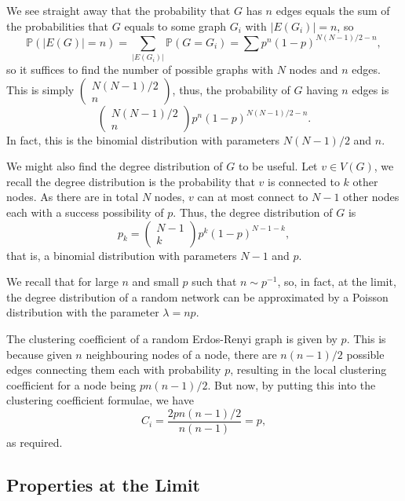 \documentclass[
]{article}
\theoremstyle{definition}
\theoremstyle{definition}
\begin{document}
We see straight away that the probability that \(G\) has \(n\) edges
equals the sum of the probabilities that \(G\) equals to some graph
\(G_i\) with \(\left| E(G_i) \right| = n\), so
\[\mathbb{P}(\left| E(G) \right| = n) = \sum_{\left| E(G_i) \right|}\mathbb{P}(G = G_i)
  = \sum p^n (1 - p)^{N (N - 1) / 2 - n},\] so it suffices to find the
number of possible graphs with \(N\) nodes and \(n\) edges. This is
simply \(\begin{pmatrix} N (N - 1) / 2 \\ n \end{pmatrix}\), thus, the
probability of \(G\) having \(n\) edges is
\[\begin{pmatrix} N (N - 1) / 2 \\ n \end{pmatrix}p^n (1 - p)^{N (N - 1) / 2 - n}.\]
In fact, this is the binomial distribution with parameters
\(N (N - 1) / 2\) and \(n\).

We might also find the degree distribution of \(G\) to be useful. Let
\(v \in V(G)\), we recall the degree distribution is the probability
that \(v\) is connected to \(k\) other nodes. As there are in total
\(N\) nodes, \(v\) can at most connect to \(N - 1\) other nodes each
with a success possibility of \(p\). Thus, the degree distribution of
\(G\) is
\[p_k = \begin{pmatrix} N - 1 \\ k \end{pmatrix} p^k (1 - p)^{N - 1 - k}, \]
that is, a binomial distribution with parameters \(N - 1\) and \(p\).

We recall that for large \(n\) and small \(p\) such that
\(n \sim p^{-1}\), so, in fact, at the limit, the degree distribution of
a random network can be approximated by a Poisson distribution with the
parameter \(\lambda = np\).

The clustering coefficient of a random Erdos-Renyi graph is given by
\(p\). This is because given \(n\) neighbouring nodes of a node, there
are \(n (n - 1) / 2\) possible edges connecting them each with
probability \(p\), resulting in the local clustering coefficient for a
node being \(p n (n - 1) / 2\). But now, by putting this into the
clustering coefficient formulae, we have
\[C_i = \frac{2 p n (n - 1) / 2}{n (n - 1)} = p,\] as required.

\hypertarget{properties-at-the-limit}{%
\subsection{Properties at the Limit}\label{properties-at-the-limit}}
\end{document}

